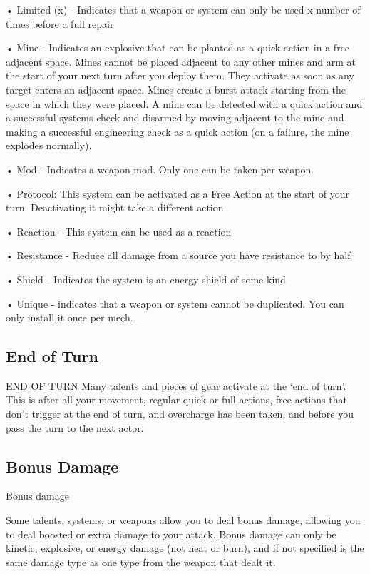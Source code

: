 •  Limited (x) - Indicates that a weapon or system can only be used x number of times before a  
  full repair
 
•  Mine - Indicates an explosive that can be planted as a quick action in a free adjacent space.  
  Mines cannot be placed adjacent to any other mines and arm at the start of your next turn after  
  you deploy them. They activate as soon as any target enters an adjacent space. Mines create a  
  burst attack starting from the space in which they were placed. A mine can be detected with a  
  quick action and a successful systems check and disarmed by moving adjacent to the mine  
  and making a successful engineering check as a quick action (on a failure, the mine explodes  
  normally).
 
•  Mod - Indicates a weapon mod. Only one can be taken per weapon.
 
•  Protocol: This system can be activated as a Free Action at the start of your turn. Deactivating  
  it might take a different action.
 
•  Reaction - This system can be used as a reaction
 
•  Resistance - Reduce all damage from a source you have resistance to by half
 
•  Shield - Indicates the system is an energy shield of some kind
 
•  Unique - indicates that a weapon or system cannot be duplicated. You can only install it once  
  per mech.
 
\subsection{End of Turn}
                                              END OF TURN  
Many talents and pieces of gear activate at the ‘end of turn’. This is after all your movement,  
regular quick or full actions, free actions that don’t trigger at the end of turn, and overcharge has  
been taken, and before you pass the turn to the next actor.  
\subsection{Bonus Damage}
                                              Bonus damage  

Some talents, systems, or weapons allow you to deal bonus damage, allowing you to deal  
boosted or extra damage to your attack. Bonus damage can only be kinetic, explosive, or energy  
damage (not heat or burn), and if not specified is the same damage type as one type from the  
weapon that dealt it.
 

